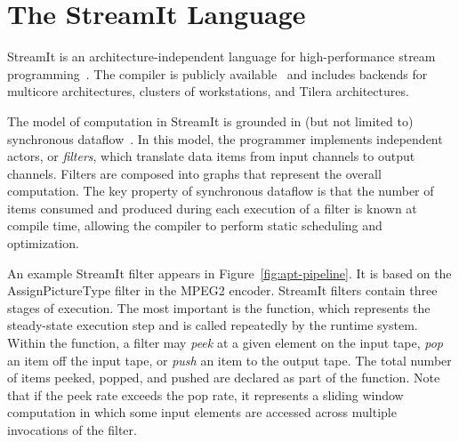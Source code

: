 %
%
%
%
%
%

\section{The StreamIt Language}
\label{sec:streamit}

StreamIt is an architecture-independent language for high-performance
stream programming~\cite{thies-cc02}.  The compiler is publicly
available~\cite{streamitweb} and includes backends for multicore
architectures, clusters of workstations, and Tilera architectures.

The model of computation in StreamIt is grounded in (but not limited
to) synchronous dataflow~\cite{lee87}.  In this model, the programmer
implements independent actors, or {\it filters}, which translate data
items from input channels to output channels.  Filters are composed
into graphs that represent the overall computation.  The key property
of synchronous dataflow is that the number of items consumed and
produced during each execution of a filter is known at compile time,
allowing the compiler to perform static scheduling and optimization.

An example StreamIt filter appears in Figure~\ref{fig:apt-pipeline}.
It is based on the AssignPictureType filter in the MPEG2 encoder.
StreamIt filters contain three stages of execution.  The most
important is the \work function, which represents the
steady-state execution step and is called repeatedly by the runtime
system.  Within the \work function, a filter may {\it peek} at a given
element on the input tape, {\it pop} an item off the input tape, or
{\it push} an item to the output tape.  The total number of items
peeked, popped, and pushed are declared as part of the \work function.
Note that if the peek rate exceeds the pop rate, it represents a
sliding window computation in which some input elements are accessed
across multiple invocations of the filter.

